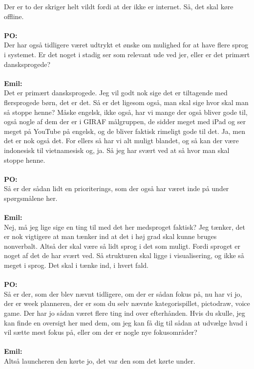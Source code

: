 Der er to der skriger helt vildt fordi at der ikke er internet.
Så, det skal køre offline.
\\\\
\textbf{PO:}\\
Der har også tidligere været udtrykt et ønske om mulighed for at have flere sprog i systemet. Er det noget i stadig ser som relevant ude ved jer, eller er det primært dansksprogede?
\\\\
\textbf{Emil:}\\
Det er primært dansksprogede.
Jeg vil godt nok sige det er tiltagende med flersprogede børn, det er det.
Så er det ligesom også, man skal sige hvor skal man så stoppe henne?
Måske engelsk, ikke også, har vi mange der også bliver gode til, også nogle af dem der er i GIRAF målgruppen, de sidder meget med iPad og ser meget på YouTube på engelsk, og de bliver faktisk rimeligt gode til det.
Ja, men det er nok også det. 
For ellers så har vi alt muligt blandet, og så kan der være indonesisk til vietnamesisk og, ja.
Så jeg har svært ved at så hvor man skal stoppe henne.
\\\\
\textbf{PO:}\\
Så er der sådan lidt en prioriterings, som der også har været inde på under spørgsmålene her.
\\\\
\textbf{Emil:}\\
Nej, må jeg lige sige en ting til med det her medsproget faktisk?
Jeg tænker, det er nok vigtigere at man tænker ind at det i høj grad skal kunne bruges nonverbalt.
Altså der skal være så lidt sprog i det som muligt. 
Fordi sproget er noget af det de har svært ved.
Så strukturen skal ligge i visualisering, og ikke så meget i sprog.
Det skal i tænke ind, i hvert fald.
\\\\
\textbf{PO:}\\
Så er der, som der blev nævnt tidligere, om der er sådan fokus på, nu har vi jo, der er week planneren, der er som du selv nævnte kategorispillet, pictodraw, voice game.
Der har jo sådan været flere ting ind over efterhånden.
Hvis du skulle, jeg kan finde en oversigt her med dem, om jeg kan få dig til sådan at udvælge hvad i vil sætte mest fokus på, eller om der er nogle nye fokusområder?
\\\\
\textbf{Emil:}\\
Altså launcheren den kørte jo, det var den som det kørte under.
